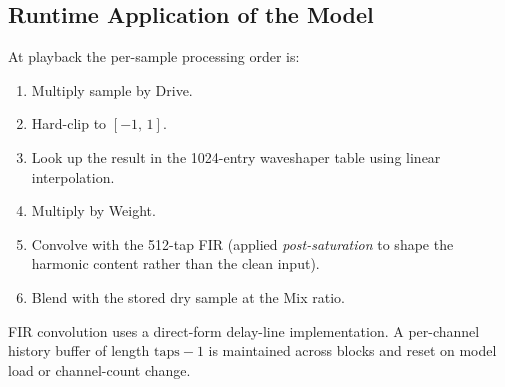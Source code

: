 \documentclass[11pt, letterpaper]{article}
\begin{document}
\subsection{Runtime Application of the Model}

At playback the per-sample processing order is:
\begin{enumerate}
  \item Multiply sample by Drive.
  \item Hard-clip to \([-1,\,1]\).
  \item Look up the result in the 1024-entry waveshaper table using
        linear interpolation.
  \item Multiply by Weight.
  \item Convolve with the 512-tap FIR (applied \emph{post-saturation}
        to shape the harmonic content rather than the clean input).
  \item Blend with the stored dry sample at the Mix ratio.
\end{enumerate}

FIR convolution uses a direct-form delay-line implementation.  A
per-channel history buffer of length \(\text{taps}-1\) is maintained
across blocks and reset on model load or channel-count change.
\end{document}
